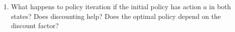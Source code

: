 \documentclass[11pt, a4paper]{article}
\begin{document}
\begin{enumerate}

    \item What happens to policy iteration if the initial policy has action $a$ in both states? Does discounting help? Does the optimal policy depend on the discount factor?


\end{enumerate}
\end{document}
